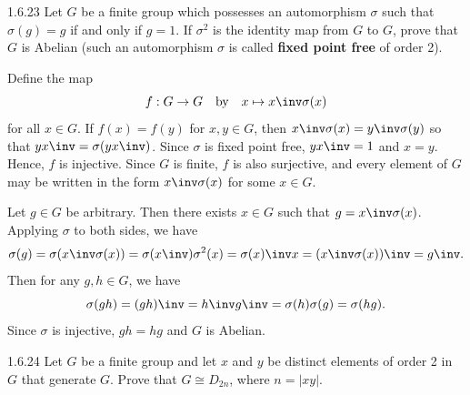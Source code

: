 \begin{spex}{1.6.23}
    Let $G$ be a finite group which possesses an automorphism $\sigma$ such that $\sigma(g) = g$ if and only if $g = 1$.
	If $\sigma^2$ is the identity map from $G$ to $G$, prove that $G$ is Abelian (such an automorphism $\sigma$ is called \textbf{fixed point free} of order 2).

\end{spex}

\begin{sol}[spsol]
    Define the map
    \[
    	f : G \to G \quad \text{by} \quad x \mapsto x\inv \sigma(x)
    \]
    for all $x \in G$.
	If $f(x) = f(y)$ for $x, y \in G$, then $x\inv \sigma(x) = y\inv \sigma(y)$ so that $yx\inv = \sigma(yx\inv)$.
	Since $\sigma$ is fixed point free, $yx\inv = 1$ and $x = y$.
	Hence, $f$ is injective.
	Since $G$ is finite, $f$ is also surjective, and every element of $G$ may be written in the form $x\inv \sigma(x)$ for some $x \in G$.

    Let $g \in G$ be arbitrary.
	Then there exists $x \in G$ such that $g = x\inv \sigma(x)$.
	Applying $\sigma$ to both sides, we have
    \[
    	\sigma(g) = \sigma(x\inv \sigma(x)) = \sigma(x\inv) \sigma^2(x) = \sigma(x)\inv x = (x\inv \sigma(x))\inv = g\inv.
    \]
    Then for any $g, h \in G$, we have
    \[
    	\sigma(gh) = (gh)\inv = h\inv g\inv = \sigma(h) \sigma(g) = \sigma(hg).
    \]
    Since $\sigma$ is injective, $gh = hg$ and $G$ is Abelian.
\end{sol}

\begin{exercise}{1.6.24}
    Let $G$ be a finite group and let $x$ and $y$ be distinct elements of order 2 in $G$ that generate $G$.
	Prove that $G \cong D_{2n}$, where $n = |xy|$.
\end{exercise}

